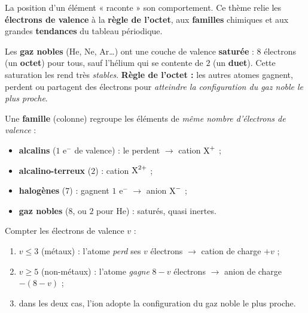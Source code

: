 \documentclass[11pt,a4paper]{article}
\begin{document}

La position d'un élément « raconte » son comportement. Ce thème relie les \textbf{électrons de valence}
à la \textbf{règle de l'octet}, aux \textbf{familles} chimiques et aux grandes \textbf{tendances} du
tableau périodique.

\begin{cle}
Les \textbf{gaz nobles} (He, Ne, Ar\dots) ont une couche de valence \textbf{saturée} : $8$ électrons
(un \textbf{octet}) pour tous, sauf l'hélium qui se contente de $2$ (un \textbf{duet}). Cette saturation
les rend très \emph{stables}. \textbf{Règle de l'octet :} les autres atomes gagnent, perdent ou
partagent des électrons pour \emph{atteindre la configuration du gaz noble le plus proche}.
\end{cle}

\begin{cle}
Une \textbf{famille} (colonne) regroupe les éléments de \emph{même nombre d'électrons de valence} :
\begin{itemize}[leftmargin=1.5em,topsep=2pt,itemsep=1pt]
  \item \textbf{alcalins} ($1$ e$^-$ de valence) : le perdent $\to$ cation $\ce{X^{+}}$ ;
  \item \textbf{alcalino-terreux} ($2$) : cation $\ce{X^{2+}}$ ;
  \item \textbf{halogènes} ($7$) : gagnent $1$ e$^-$ $\to$ anion $\ce{X^{-}}$ ;
  \item \textbf{gaz nobles} ($8$, ou $2$ pour He) : saturés, quasi inertes.
\end{itemize}
\end{cle}

\begin{methode}
Compter les électrons de valence $v$ :
\begin{enumerate}[leftmargin=1.7em,topsep=2pt,itemsep=1pt]
  \item $v \le 3$ (métaux) : l'atome \emph{perd} ses $v$ électrons $\to$ cation de charge $+v$ ;
  \item $v \ge 5$ (non-métaux) : l'atome \emph{gagne} $8-v$ électrons $\to$ anion de charge $-(8-v)$ ;
  \item dans les deux cas, l'ion adopte la configuration du gaz noble le plus proche.
\end{enumerate}
\end{methode}
\end{document}
